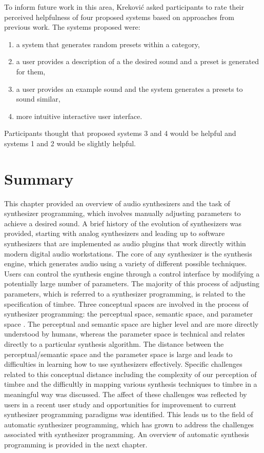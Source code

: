 To inform future work in this area, Krekovi\'{c} asked participants to rate their perceived helpfulness of four proposed systems based on approaches from previous work. The systems proposed were: 
\begin{enumerate}
    \item a system that generates random presets within a category,
    \item a user provides a description of a the desired sound and a preset is generated for them,
    \item a user provides an example sound and the system generates a presets to sound similar,
    \item more intuitive interactive user interface.
\end{enumerate}

Participants thought that proposed systems 3 and 4 would be helpful and systems 1 and 2 would be slightly helpful.

\section{Summary}
This chapter provided an overview of audio synthesizers and the task of synthesizer programming, which involves manually adjusting parameters to achieve a desired sound. A brief history of the evolution of synthesizers was provided, starting with analog synthesizers and leading up to software synthesizers that are implemented as audio plugins that work directly within modern digital audio workstations. The core of any synthesizer is the synthesis engine, which generates audio using a variety of different possible techniques. Users can control the synthesis engine through a control interface by modifying a potentially large number of parameters. The majority of this process of adjusting parameters, which is referred to a synthesizer programming, is related to the specification of timbre. Three conceptual spaces are involved in the process of synthesizer programming: the perceptual space, semantic space, and parameter space \cite{pardo2019learning}. The perceptual and semantic space are higher level and are more directly understood by humans, whereas the parameter space is technical and relates directly to a particular synthesis algorithm. The distance between the perceptual/semantic space and the parameter space is large and leads to difficulties in learning how to use synthesizers effectively. Specific challenges related to this conceptual distance including the complexity of our perception of timbre and the difficultly in mapping various synthesis techniques to timbre in a meaningful way was discussed. The affect of these challenges was reflected by users in a recent user study \cite{krekovic2019insights} and opportunities for improvement to current synthesizer programming paradigms was identified. This leads us to the field of automatic synthesizer programming, which has grown to address the challenges associated with synthesizer programming. An overview of automatic synthesis programming is provided in the next chapter.